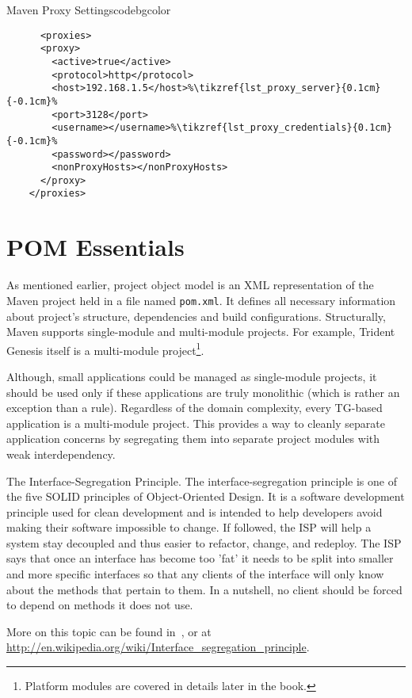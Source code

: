   \begin{code}{Maven Proxy Settings}{\label{lst:proxy}}{codebgcolor}
    \begin{lstlisting}
      <proxies>
	  <proxy>
	    <active>true</active>
	    <protocol>http</protocol>
	    <host>192.168.1.5</host>%\tikzref{lst_proxy_server}{0.1cm}{-0.1cm}%
	    <port>3128</port>
	    <username></username>%\tikzref{lst_proxy_credentials}{0.1cm}{-0.1cm}%
	    <password></password>
	    <nonProxyHosts></nonProxyHosts>
	  </proxy>
	</proxies>
    \end{lstlisting}
  \end{code}

  \section{POM Essentials}

  As mentioned earlier, project object model is an XML representation of the Maven project held in a file named \texttt{pom.xml}. 
  It defines all necessary information about project's structure, dependencies and build configurations.
  Structurally, Maven supports single-module and multi-module projects.
  For example, Trident Genesis itself is a multi-module project\footnote{Platform modules are covered in details later in the book.}.

  Although, small applications could be managed as single-module projects, it should be used only if these applications are truly monolithic (which is rather an exception than a rule).  
  Regardless of the domain complexity, every TG-based application is a multi-module project.
  This provides a way to cleanly separate application concerns by segregating them into separate project modules with weak interdependency.
  
  \begin{notebox}{The Interface-Segregation Principle.}{\label{mb:segregation}}
    The interface-segregation principle is one of the five SOLID principles of Object-Oriented Design.
    It is a software development principle used for clean development and is intended to help developers avoid making their software impossible to change. 
    If followed, the ISP will help a system stay decoupled and thus easier to refactor, change, and redeploy. 
    The ISP says that once an interface has become too 'fat' it needs to be split into smaller and more specific interfaces so that any clients of the interface will only know about the methods that pertain to them. In a nutshell, no client should be forced to depend on methods it does not use.

    More on this topic can be found in~\cite{Martin2002}, or at \url{http://en.wikipedia.org/wiki/Interface_segregation_principle}.
  \end{notebox}   


